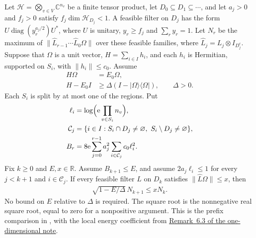\begin{theorem}
    \label{thm:logarithmic_prefix_step}
    \leanok
    Let $\mathcal H=\bigotimes_{v\in V}\mathbb C^{n_v}$ be a finite
    tensor product, let $D_0\subseteq D_1\subseteq\cdots$, and let
    $a_j>0$ and $f_j>0$ satisfy $f_j\dim\mathcal H_{D_j}<1$.
    A feasible filter on $D_j$ has the form
    $U\operatorname{diag}(y_r^{a_j/2})U^*$, where $U$ is unitary,
    $y_r\ge f_j$ and $\sum_r y_r=1$. Let $N_r$ be the maximum of
    $\lVert\widehat L_{r-1}\cdots\widehat L_0\Omega\rVert$ over
    these feasible families, where $\widehat L_j=L_j\otimes I_{D_j^c}$.
    Suppose that $\Omega$ is a unit vector, $H=\sum_{i\in I}h_i$,
    and each $h_i$ is Hermitian, supported on $S_i$, with
    $\lVert h_i\rVert\le c_0$. Assume
    \begin{align*}
        H\Omega & =E_0\Omega,                                          \\
        H-E_0I  & \ge\Delta(I-\lvert\Omega\rangle\langle\Omega\rvert),
        \qquad \Delta>0.
    \end{align*}
    Each $S_i$ is split by at most one of the regions. Put
    \begin{align*}
        \ell_i       & =\log\Bigl(\mathrm e\prod_{v\in S_i}n_v\Bigr), \\
        \mathcal C_j & =\{i\in I:S_i\cap D_j\ne\varnothing,
        \ S_i\setminus D_j\ne\varnothing\},                           \\
        B_r          & =8\mathrm e\sum_{j=0}^{r-1}a_j^2
        \sum_{i\in\mathcal C_j}c_0\ell_i^2.
    \end{align*}
    Fix $k\ge0$ and $E,x\in\mathbb R$. Assume $B_{k+1}\le E$,
    and assume $2a_j\ell_i\le1$ for every $j<k+1$ and
    $i\in\mathcal C_j$. If every feasible filter $L$ on $D_k$
    satisfies $\lVert\widehat L\Omega\rVert\le x$, then
    \begin{align*}
        \sqrt{1-E/\Delta}\,N_{k+1}\le xN_k.
    \end{align*}
    No bound on $E$ relative to $\Delta$ is required. The square
    root is the nonnegative real square root, equal to zero for a
    nonpositive argument. This is the prefix comparison in
    \cite[Lemma~3.2]{OpenAI2026AreaLaw}, with the local energy
    coefficient from
    \href{https://github.com/LionSR/TNLean/blob/67ea93e29f7c088f766b271208a2fde4cccf04a6/docs/notes/one_dimensional_note/part1_arealaw.tex#L711-L734}{Remark~6.3 of the one-dimensional note}.
\end{theorem}
